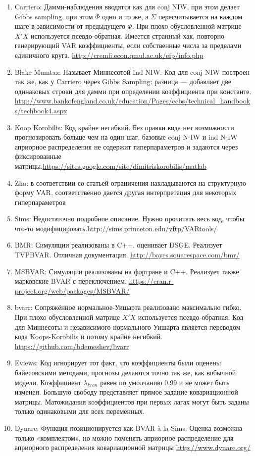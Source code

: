 \documentclass[11pt]{article} %
\newcommand{\post}{\overline}
\begin{document}
\begin{enumerate}
\item Carriero: Дамми-наблюдения вводятся как для conj NIW, при этом делает Gibbs sampling, при этом $\post\Phi$ одно и то же, а $\Sigma$ пересчитывается на каждом шаге в зависимости от предыдущего $\Phi$. При плохо обусловленной матрице $X'X$ используется псевдо-обратная. Имеется странный хак, повторно генерирующий VAR коэффициенты, если собственные числа за пределами единичного круга. \url{http://cremfi.econ.qmul.ac.uk/efp/info.php}
\item Blake Mumtaz: Называет Миннесотой Ind NIW.  Код для conj NIW построен так же, как у Carriero через Gibbs Sampling: разница --- добавляет две одинаковых строки для дамми при определении коэффициента при константе. \url{http://www.bankofengland.co.uk/education/Pages/ccbs/technical_handbooks/techbook4.aspx}
\item Koop Korobilis: Код крайне негибкий. Без правки кода нет возможности прогнозировать больше чем на один шаг, базовые conj N-IW и ind N-IW априорное распределения не содержит  гиперпараметров и задаются через фиксированные матрицы.\url{https://sites.google.com/site/dimitriskorobilis/matlab}\\
\item Zha: в соответствии со статьей ограничения накладываются на структурную форму VAR, соответственно дается другая интерпретация для некоторых гиперпараметров
\item Sims: Недостаточно подробное описание. Нужно прочитать весь код, чтобы что-то модифицировать.\url{http://sims.princeton.edu/yftp/VARtools/}
\item BMR: Симуляции реализованы в C++.  оценивает DSGE.  Реализует TVPBVAR. Отличная документация. \url{ http://bayes.squarespace.com/bmr/}
\item MSBVAR: Симуляции реализованы на фортране и C++. Реализует также марковские BVAR с переключением.  \url{https://cran.r-project.org/web/packages/MSBVAR/ }
\item bvarr: Сопряжённое нормальное-Уишарта реализовано максимально гибко.  При плохо обусловленной матрице $X'X$ используется псевдо-обратная. Код для Миннесоты и независимого нормального Уишарта является переводом кода Koops-Korobilis и потому крайне негибкий. \url{https://github.com/bdemeshev/bvarr }
\item Eviews: Код игнорирует тот факт, что коэффициенты были оценены байесовскими методами, прогнозы делаются точно так же, как вобычной модели. Коэффициент $\lambda_{kron}$ равен по умолчанию 0,99 и не может быть изменен. Большую свободу представляет прямое задание ковариационной матрицы. Матожидания коэффициентов при первых лагах могут быть заданы только одинаковыми для всех переменных.
\item Dynare: Функция позиционируется как BVAR \`a la Sims. Оценка возможна только «комплектом», но можно поменять априорное распределение для априорного распределения ковариационной матрицы  \url{http://www.dynare.org/}
\end{enumerate}
\newpage
\end{document}
